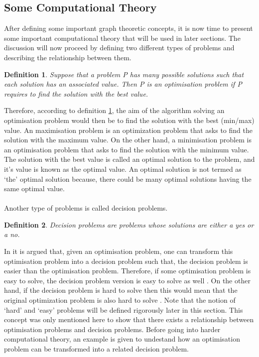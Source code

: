 \documentclass[12pt]{article}
\newtheorem{definition}{Definition}[subsection]
\numberwithin{equation}{subsection}
\numberwithin{table}{subsection}
\begin{document}
\subsection{Some Computational Theory}
After defining some important graph theoretic concepts, it is now time to present some important computational theory that will be used in later sections. The discussion will now proceed by defining two different types of problems and describing the relationship between them.
\begin{definition}
\label{optimization problems}
Suppose that a problem P has many possible solutions such that each solution has an associated value. Then P is an optimisation problem if P requires to find the solution with the best value.  
\end{definition}
Therefore, according to definition \ref{optimization problems}, the aim of the algorithm solving an optimisation problem would then be to find the solution with the best (min/max) value. An maximisation problem is an optimization problem that asks to find the solution with the maximum value. On the other hand, a minimisation problem is an optimisation problem that asks to find the solution with the minimum value. The solution with the best value is called an optimal solution to the problem, and it's value is known as the optimal value. An optimal solution is not termed as `the' optimal solution because, there could be many optimal solutions having the same optimal value. \cite{cormen_leiserson_rivest_stein} \\\\Another type of problems is called decision problems.
\begin{definition}
\label{decision problems}
Decision problems are problems whose solutions are either a yes or a no. 
\end{definition}
In \cite{cormen_leiserson_rivest_stein} it is argued that, given an optimisation problem, one can transform this optimisation problem into a decision problem such that, the decision problem is easier than the optimisation problem. Therefore, if some optimisation problem is easy to solve, the decision problem version is easy to solve as well \cite{cormen_leiserson_rivest_stein}. On the other hand, if the decision problem is hard to solve then this would mean that the original optimization problem is also hard to solve \cite{cormen_leiserson_rivest_stein}. Note that the notion of `hard' and `easy' problems will be defined rigorously later in this section. This concept was only mentioned here to show that there exists a relationship between optimisation problems and decision problems. Before going into harder computational theory, an example is given to undestand how an optimisation problem can be transformed into a related decision problem.
\end{document}
